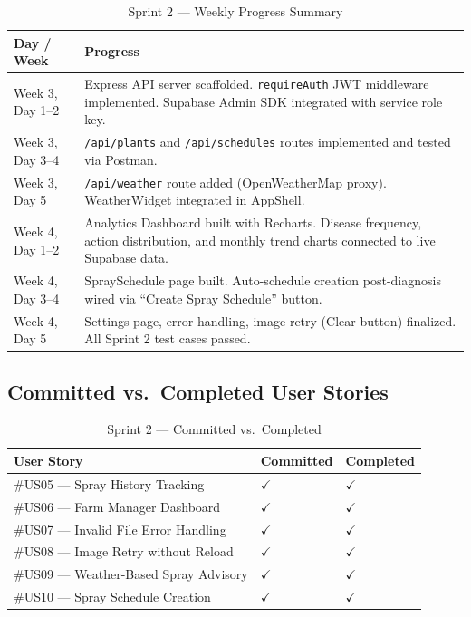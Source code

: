 \documentclass[12pt,a4paper]{report}
\begin{document}
\begin{table}[H]
\centering
\caption{Sprint 2 --- Weekly Progress Summary}
\label{tab:sprint2_progress}
\renewcommand{\arraystretch}{1.4}
\begin{tabular}{|p{3cm}|p{10.5cm}|}
\hline
\textbf{Day / Week} & \textbf{Progress} \\
\hline
Week 3, Day 1--2 & Express API server scaffolded. \texttt{requireAuth} JWT middleware implemented. Supabase Admin SDK integrated with service role key. \\
\hline
Week 3, Day 3--4 & \texttt{/api/plants} and \texttt{/api/schedules} routes implemented and tested via Postman. \\
\hline
Week 3, Day 5 & \texttt{/api/weather} route added (OpenWeatherMap proxy). WeatherWidget integrated in AppShell. \\
\hline
Week 4, Day 1--2 & Analytics Dashboard built with Recharts. Disease frequency, action distribution, and monthly trend charts connected to live Supabase data. \\
\hline
Week 4, Day 3--4 & SpraySchedule page built. Auto-schedule creation post-diagnosis wired via ``Create Spray Schedule'' button. \\
\hline
Week 4, Day 5 & Settings page, error handling, image retry (Clear button) finalized. All Sprint 2 test cases passed. \\
\hline
\end{tabular}
\end{table}

\subsection{Committed vs.\ Completed User Stories}

\begin{table}[H]
\centering
\caption{Sprint 2 --- Committed vs.\ Completed}
\label{tab:sprint2_cvc}
\renewcommand{\arraystretch}{1.4}
\begin{tabular}{|p{8cm}|p{2.5cm}|p{2.5cm}|}
\hline
\textbf{User Story} & \textbf{Committed} & \textbf{Completed} \\
\hline
\#US05 --- Spray History Tracking & $\checkmark$ & $\checkmark$ \\
\hline
\#US06 --- Farm Manager Dashboard & $\checkmark$ & $\checkmark$ \\
\hline
\#US07 --- Invalid File Error Handling & $\checkmark$ & $\checkmark$ \\
\hline
\#US08 --- Image Retry without Reload & $\checkmark$ & $\checkmark$ \\
\hline
\#US09 --- Weather-Based Spray Advisory & $\checkmark$ & $\checkmark$ \\
\hline
\#US10 --- Spray Schedule Creation & $\checkmark$ & $\checkmark$ \\
\hline
\end{tabular}
\end{table}
\end{document}
